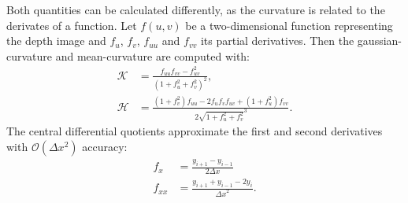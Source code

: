 Both quantities can be calculated differently, as the \gls{curvature} is related to the derivates of a function.
Let $f(u, v)$ be a two-dimensional function representing the depth image and $f_u$, $f_v$, $f_{uu}$ and $f_{vv}$ its partial derivatives.
Then the \gls{gaussian-curvature} and \gls{mean-curvature} are computed with:
\begin{equation}
\begin{aligned}
    \mathcal{K} &= \frac{f_{uu} f_{vv} - f_{uv}^2}{{(1 + f_u^2 + f_v^2)}^2}\text{,} \\
    \mathcal{H} &= \frac{{(1 + f_{v}^2)} f_{uu} - 2 f_u f_v f_{uv} + {(1 + f_u^2)} f_{vv}}{2 \sqrt{1 + f_u^2 + f_v^2}^3}\text{.}
\end{aligned}
\end{equation}
The central differential quotients approximate the first and second derivatives with $\mathcal{O}(\Delta x^2)$ accuracy:
\begin{equation}
\begin{aligned}
    f_{x} &= \frac{y_{i+1} - y_{i-1}}{2 \Delta x} \\
    f_{xx} &= \frac{y_{i+1} + y_{i-1} - 2 y_{i}}{{\Delta x}^2}\text{.}
\end{aligned}
\end{equation}

